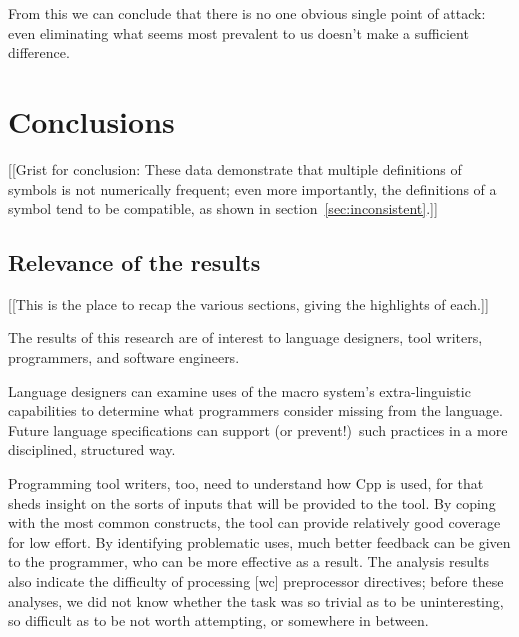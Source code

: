 \documentclass[10pt]{article}
\begin{document}
    From this we can conclude that there is no one obvious single point of
      attack:  even eliminating what seems most prevalent to us doesn't
      make a sufficient difference.



\section{Conclusions}
\label{sec:conclusion}

[[Grist for conclusion: These data demonstrate that multiple definitions of
symbols is not numerically frequent; even more importantly, the definitions
of a symbol tend to be compatible, as shown in
section~\ref{sec:inconsistent}.]]


\subsection{Relevance of the results}

[[This is the place to recap the various sections, giving the highlights of
each.]]

The results of this research are of interest to language designers, tool
writers, programmers, and software engineers.

Language designers can examine uses of the macro system's extra-linguistic
capabilities to determine what programmers consider missing from the
language.  Future language specifications can support (or prevent!)\ such
practices in a more disciplined, structured way.


Programming tool writers, too, need to understand how Cpp is used, for that
sheds insight on the sorts of inputs that will be provided to the tool.  By
coping with the most common constructs, the tool can provide relatively
good coverage for low effort.  By identifying problematic uses, much better
feedback can be given to the programmer, who can be more effective as a
result.  The analysis results also indicate the difficulty of processing [wc]
preprocessor directives; before these analyses, we did not know whether the
task was so trivial as to be uninteresting, so difficult as to be not worth
attempting, or somewhere in between.
\end{document}
